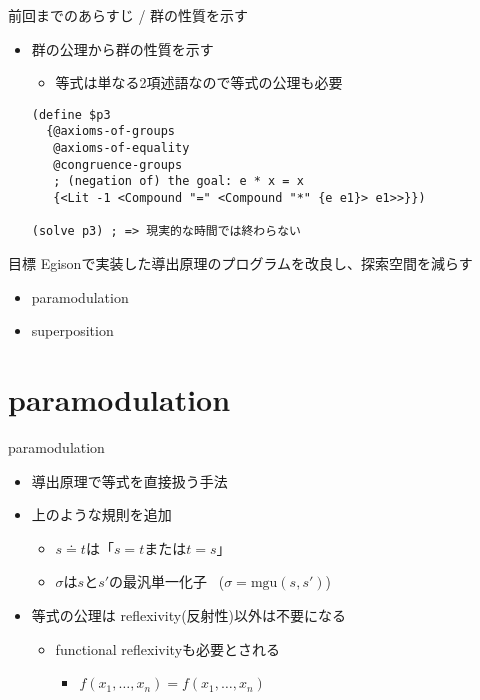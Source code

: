 \documentclass[dvipdfmx,11pt,notheorems]{beamer}
\theoremstyle{definition}
\newcommand{\blue}[1]{{\color{blue} #1}}
\begin{document}
\begin{frame}[fragile]{前回までのあらすじ / 群の性質を示す}
  \begin{itemize}
    \item 群の公理から群の性質を示す
    \begin{itemize}
      \item 等式は単なる2項述語なので等式の公理も必要
    \end{itemize}
    \begin{verbatim}
(define $p3
  {@axioms-of-groups
   @axioms-of-equality
   @congruence-groups
   ; (negation of) the goal: e * x = x
   {<Lit -1 <Compound "=" <Compound "*" {e e1}> e1>>}})

(solve p3) ; => 現実的な時間では終わらない
    \end{verbatim}
  \end{itemize}
  \begin{block}{目標}
    Egisonで実装した導出原理のプログラムを改良し、探索空間を減らす
    \begin{itemize}
      \item paramodulation
      \item superposition
    \end{itemize}
  \end{block}
\end{frame}

\section{paramodulation}
\begin{frame}{paramodulation}

  {\Large
  \begin{prooftree}
  \end{prooftree}
  }
  \begin{itemize}
    \item 導出原理で等式を直接扱う手法
    \item 上のような規則を追加
    \begin{itemize}
      \item $s \doteq t$は「$s = t$または$t = s$」
      \item $\sigma$は$s$と$s'$の最汎単一化子 \, ($\sigma = \text{mgu}(s, s')$)
    \end{itemize}

    \item 等式の公理は\blue{reflexivity(反射性)以外は}不要になる
    \begin{itemize}
      \item functional reflexivityも必要とされる
      \begin{itemize}
        \item $f(x_1, \ldots, x_n) = f(x_1, \ldots, x_n)$
      \end{itemize}
    \end{itemize}
  \end{itemize}
\end{frame}
\end{document}
